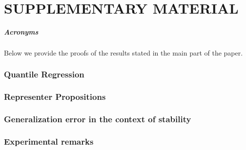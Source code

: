 \onecolumn
\part*{SUPPLEMENTARY MATERIAL}
\renewcommand{\thesection}{S.\arabic{section}}
\renewcommand{\thesubsection}{S.\arabic{section}.\arabic{subsection}}
\renewcommand{\thesubsubsection}{S.\arabic{section}.\arabic{subsection}%
    .\arabic{subsubsection}}
\renewcommand{\thetable}{S.\arabic{table}}
\renewcommand{\thefigure}{S.\arabic{figure}}
%
{\centering
\subsubsection*{Acronyms}
\printacronyms[heading=none]\par}
Below we provide the proofs of the results stated in the main part of the
paper.
\begin{refsection}
\section{Quantile Regression}
\label{appendix:qr}


\section{Representer Propositions}
\label{appendix:representer}


\section{Generalization error in the context of stability}
\label{appendix:stability}


\section{Experimental remarks}
\label{appendix:experiments}

\printbibliography[heading=subbibliography]
\end{refsection}
%

%
